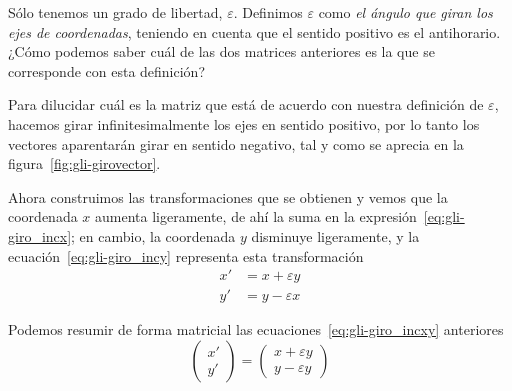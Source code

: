 Sólo tenemos un grado de libertad, $\varepsilon$.
Definimos $\varepsilon$ como \emph{el ángulo que giran los ejes de coordenadas}, teniendo en cuenta que el sentido positivo es el antihorario.
¿Cómo podemos saber cuál de las dos matrices anteriores es la que se corresponde con esta definición?

Para dilucidar cuál es la matriz que está de acuerdo con nuestra definición de $\varepsilon$, hacemos girar infinitesimalmente los ejes en sentido positivo, por lo tanto los vectores aparentarán girar en sentido negativo, tal y como se aprecia en la figura~\ref{fig:gli-girovector}.

Ahora construimos las transformaciones que se obtienen y vemos que la coordenada $x$ aumenta ligeramente, de ahí la suma en la expresión~\eqref{eq:gli-giro_incx}; en cambio, la coordenada $y$ disminuye ligeramente, y la ecuación~\eqref{eq:gli-giro_incy} representa
esta transformación
\begin{subequations}\label{eq:gli-giro_incxy}
  \begin{align}
    \label{eq:gli-giro_incx}
    x' &= x + \varepsilon y \\
    \label{eq:gli-giro_incy}
    y' &= y - \varepsilon x
  \end{align}
\end{subequations}

Podemos resumir de forma matricial las ecuaciones~\eqref{eq:gli-giro_incxy} anteriores
\begin{equation}\label{eq:gli-giro_incxy_matricial}
  \begin{pmatrix}
    x' \\ y'
  \end{pmatrix}
  = \begin{pmatrix}
    x + \varepsilon y\\
    y - \varepsilon y
    \end{pmatrix}
\end{equation}


